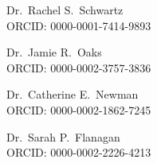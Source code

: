 \documentclass[12pt]{article}
\begin{document}
\vspace{1mm}
\noindent Dr.\ Rachel S.\ Schwartz\\
ORCID: 0000-0001-7414-9893

\vspace{1mm}
\noindent Dr.\ Jamie R.\ Oaks\\
ORCID: 0000-0002-3757-3836

\vspace{1mm}
\noindent Dr.\ Catherine E.\ Newman\\
ORCID: 0000-0002-1862-7245

\vspace{1mm}
\noindent Dr.\ Sarah P.\ Flanagan\\
ORCID: 0000-0002-2226-4213
\end{document}
